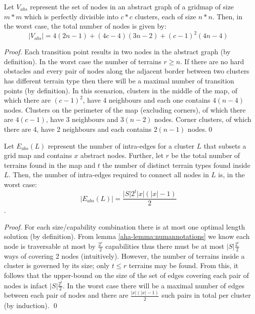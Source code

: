\begin{lemma}
\label{aha-lemma:maxnodes}
Let $V_{abs}$ represent the set of nodes in an abstract graph of a gridmap of size $m*m$ which is perfectly divisible into $c*c$ clusters, each of size $n*n$. Then, in the worst case, the total number of nodes is given by:
$$|V_{abs}| = 4(2n-1) + (4c - 4)(3n-2) + (c-1)^2(4n-4)$$
\end{lemma}

\begin{proof}
Each transition point results in two nodes in the abstract graph (by definition). 
In the worst case the number of terrains $r \geq n$. 
If there are no hard obstacles and every pair of nodes along the adjacent border between two clusters has different terrain type then there will be a maximal number of transition points (by definition). 
In this scenarion, clusters in the middle of the map, of which there are $(c-1)^2$, have 4 neighbours and each one contains $4(n-4)$ nodes. 
Clusters on the perimeter of the map (excluding corners), of which there are $4(c-1)$, have 3 neighbours and $3(n-2)$ nodes. 
Corner clusters, of which there are 4, have 2 neighbours and each contains $2(n-1)$ nodes.\qed
\end{proof}

\begin{lemma}
\label{aha-lemma:maxedgesincluster}
Let $E_{abs}(L)$ represent the number of intra-edges for a cluster $L$ that subsets a grid map and contains $x$ abstract nodes. Further, let $r$ be the total number of terrains found in the map and $t$ the number of distinct terrain types found inside $L$. Then, the number of intra-edges required to connect all nodes in $L$ is, in the worst case:
 $$|E_{abs}(L)| = \frac{|S|2^t|x|(|x|-1)}{2}$$.
\end{lemma}

\begin{proof}
For each size/capability combination there is at most one optimal length solution (by definition). From lemma \ref{aha-lemma:numannotations} we know each node is traversable at most by $\frac{2^r}{2}$ capabilities thus there must be at most $|S|\frac{2^r}{2} $ ways of covering 2 nodes (intuitively). 
However, the number of terrains inside a cluster is governed by its size; only $t \leq r$ terrains may be found. From this, it follows that the upper-bound on the size of the set of edges covering each pair of nodes is infact $|S|\frac{2^t}{2}$. In the worst case there will be a maximal number of edges between each pair of nodes and there are $\frac{|x|(|x|-1)}{2}$ such pairs in total per cluster (by induction). \qed
\end{proof}

